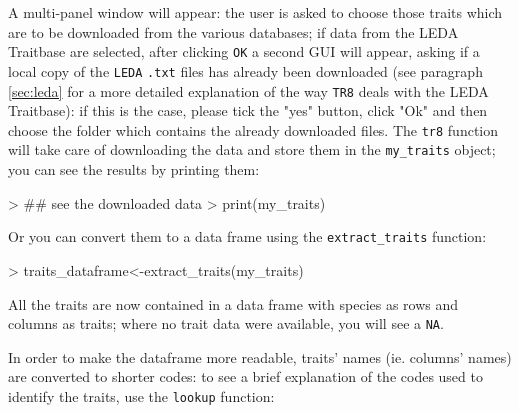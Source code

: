 \documentclass{article}
\begin{document}
  A multi-panel window will appear: the user is asked to choose those
  traits which are to be downloaded from the various databases; if data from the LEDA Traitbase are selected, after
  clicking \texttt{OK} a second GUI will appear, asking if a local copy
  of the \texttt{LEDA} \texttt{.txt} files has already been downloaded
  (see paragraph \ref{sec:leda} for a more detailed explanation of the
  way \texttt{TR8} deals with the LEDA Traitbase): if this is the case, please tick the
  "yes" button, click "Ok" and then choose the folder which contains
  the already downloaded files.  
  The \texttt{tr8} function will take care of downloading the data and
  store them in the \texttt{my\_traits} object; you can see the results
  by printing them:

\begin{Schunk}
\begin{Sinput}
> ## see the downloaded data
> print(my_traits)
\end{Sinput}
\end{Schunk}

  Or you can convert them to a data frame using the \texttt{extract\_traits} function:
  
\begin{Schunk}
\begin{Sinput}
> traits_dataframe<-extract_traits(my_traits)
\end{Sinput}
\end{Schunk}



  All the traits are now contained in a data frame with species as rows
  and columns as traits; where no trait data were available, you will
  see a \texttt{NA}. 
  
  

  
  
  In order to make the dataframe more readable,  traits' names (ie. columns' names) are converted to shorter codes: to see a brief explanation of the codes used to identify the traits, use the \texttt{lookup} function: 
\end{document}

